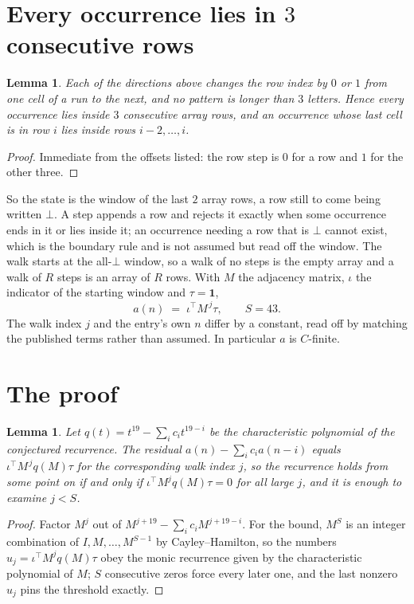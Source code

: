 \documentclass[11pt,a4paper]{article}
\theoremstyle{plain}
\newtheorem{lemma}[theorem]{Lemma}
\theoremstyle{definition}
\begin{document}
\section{Every occurrence lies in $3$ consecutive rows}

\begin{lemma}\label{lem:win}
Each of the directions above changes the row index by $0$ or $1$ from one cell of a run to the
next, and no pattern is longer than $3$ letters. Hence every occurrence lies inside $3$
consecutive array rows, and an occurrence whose last cell is in row $i$ lies inside rows
$i-2,\dots,i$.
\end{lemma}

\begin{proof}
Immediate from the offsets listed: the row step is $0$ for a row and $1$ for the other three.
\end{proof}

So the state is the window of the last $2$ array rows, a row still to come being written
$\bot$. A step appends a row and rejects it exactly when some occurrence ends in it or lies
inside it; an occurrence needing a row that is $\bot$ cannot exist, which is the boundary rule
and is not assumed but read off the window. The walk starts at the all-$\bot$ window, so a walk
of no steps is the empty array and a walk of $R$ steps is an array of $R$ rows. With $M$ the
adjacency matrix, $\iota$ the indicator of the starting window and $\tau=\mathbf{1}$,
\[
a(n)\;=\;\iota^{\!\top}M^{\,j}\tau ,\qquad S=43.
\]
The walk index $j$ and the entry's own $n$ differ by a constant, read off by matching the
published terms rather than assumed. In particular $a$ is $C$-finite.

\section{The proof}

\begin{lemma}\label{lem:crit}
Let $q(t)=t^{19}-\sum_i c_it^{19-i}$ be the characteristic polynomial of the
conjectured recurrence. The residual $a(n)-\sum_ic_ia(n-i)$ equals
$\iota^{\!\top}M^{\,j}q(M)\tau$ for the corresponding walk index $j$, so the recurrence
holds from some point on if and only if $\iota^{\!\top}M^{j}q(M)\tau=0$ for all large $j$,
and it is enough to examine $j<S$.
\end{lemma}

\begin{proof}
Factor $M^{j}$ out of $M^{j+19}-\sum_ic_iM^{j+19-i}$. For the bound, $M^{S}$
is an integer combination of $I,M,\dots,M^{S-1}$ by Cayley--Hamilton, so the numbers
$u_j=\iota^{\!\top}M^{j}q(M)\tau$ obey the monic recurrence given by the characteristic
polynomial of $M$; $S$ consecutive zeros force every later one, and the last nonzero $u_j$
pins the threshold exactly.
\end{proof}
\end{document}
